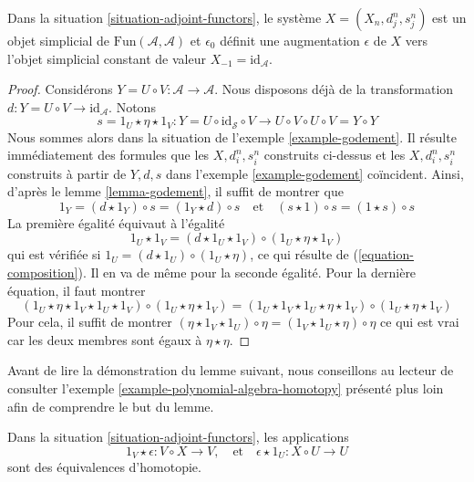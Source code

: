 \begin{lemma}
\label{lemma-standard-simplicial}
Dans la situation \ref{situation-adjoint-functors},
le système $X = (X_n, d^n_j, s^n_j)$
est un objet simplicial de $\text{Fun}(\mathcal{A}, \mathcal{A})$
et $\epsilon_0$ définit une augmentation $\epsilon$ de $X$
vers l'objet simplicial constant de valeur $X_{-1} = \text{id}_\mathcal{A}$.
\end{lemma}

\begin{proof}
Considérons $Y = U \circ V : \mathcal{A} \to \mathcal{A}$.
Nous disposons déjà de la transformation
$d : Y = U \circ V \to \text{id}_\mathcal{A}$. Notons
$$
s = 1_U \star \eta \star 1_V :
Y = U \circ \text{id}_\mathcal{S} \circ V
\longrightarrow
U \circ V \circ U \circ V = Y \circ Y
$$
Nous sommes alors dans la situation de l'exemple \ref{example-godement}.
Il résulte immédiatement des formules que
les $X, d^n_i, s^n_i$ construits ci-dessus et les
$X, d^n_i, s^n_i$ construits à partir de $Y, d, s$
dans l'exemple \ref{example-godement} coïncident. Ainsi, d'après le
lemme \ref{lemma-godement}, il suffit de montrer que
$$
1_Y = (d \star 1_Y) \circ s = (1_Y \star d) \circ s
\quad\text{et}\quad
(s \star 1) \circ s = (1 \star s) \circ s
$$
La première égalité équivaut à l'égalité
$$
1_U \star 1_V = (d \star 1_U \star 1_V) \circ (1_U \star \eta \star 1_V)
$$
qui est vérifiée si $1_U = (d \star 1_U) \circ (1_U \star \eta)$,
ce qui résulte de (\ref{equation-composition}). Il en va de même pour la
seconde égalité. Pour la dernière équation, il faut montrer
$$
(1_U \star \eta \star 1_V \star 1_U \star 1_V) \circ
(1_U \star \eta \star 1_V) =
(1_U \star 1_V \star 1_U \star \eta \star 1_V) \circ
(1_U \star \eta \star 1_V)
$$
Pour cela, il suffit de montrer
$(\eta \star 1_V \star 1_U) \circ \eta = (1_V \star 1_U \star \eta) \circ \eta$
ce qui est vrai car les deux membres sont égaux à $\eta \star \eta$.
\end{proof}

\noindent
Avant de lire la démonstration du lemme suivant, nous conseillons au
lecteur de consulter l'exemple \ref{example-polynomial-algebra-homotopy}
présenté plus loin
afin de comprendre le but du lemme.

\begin{lemma}
\label{lemma-standard-simplicial-homotopy}
Dans la situation \ref{situation-adjoint-functors}, les applications
$$
1_V \star \epsilon : V \circ X \to V,
\quad\text{et}\quad
\epsilon \star 1_U : X \circ U \to U
$$
sont des équivalences d'homotopie.
\end{lemma}


